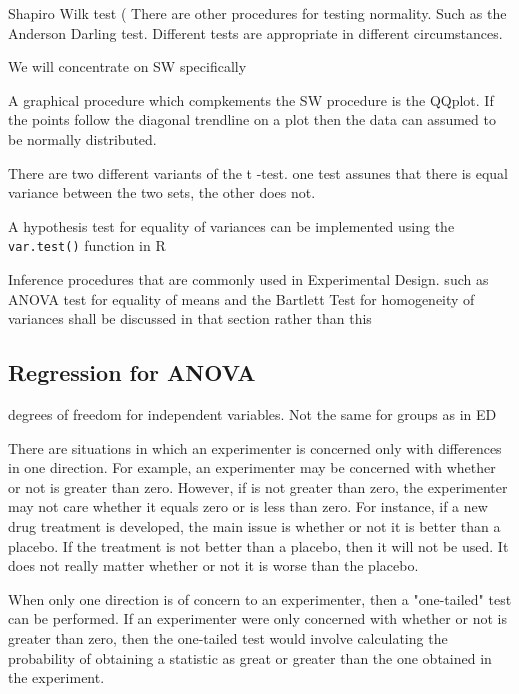  Shapiro Wilk test ( There are other procedures for testing normality. Such as the Anderson Darling test. Different tests are appropriate in different circumstances.

We will concentrate on SW specifically

A graphical procedure which compkements the SW procedure is the QQplot. If the points follow the diagonal trendline on a plot then the data can assumed to be normally distributed.


There are two different variants of the t -test. one test assunes that there is equal variance between the two sets, the other does not. 

A hypothesis test for equality of variances can be implemented using the \texttt{var.test()} function in R


Inference procedures that are commonly used in Experimental Design. such as ANOVA test for equality of means and the Bartlett Test for homogeneity of variances shall be discussed in that section rather than this

\subsection*{Regression for ANOVA  }

degrees of freedom for independent variables. Not the same for groups as in ED





 
There are situations in which an experimenter is concerned only with differences in one direction. For example, an experimenter may be concerned with whether or not  is greater than zero. However, if  is not greater than zero, the experimenter may not care whether it equals zero or is less than zero. For instance, if a new drug treatment is developed, the main issue is whether or not it is better than a placebo. If the treatment is not better than a placebo, then it will not be used. It does not really matter whether or not it is worse than the placebo.
 
When only one direction is of concern to an experimenter, then a "one-tailed" test can be performed. If an experimenter were only concerned with whether or not   is greater than zero, then the one-tailed test would involve calculating the probability of obtaining a statistic as great or greater than the one obtained in the experiment.
 
